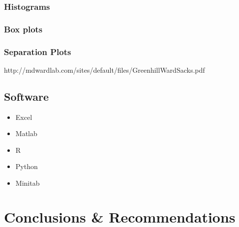 \documentclass[11pt,a4paper,article]{memoir} %
\begin{document}
\subsection{Histograms}
\subsection{Box plots}
\subsection{Separation Plots}
http://mdwardlab.com/sites/default/files/GreenhillWardSacks.pdf

\section{Software}
\begin{itemize}
\item Excel
\item Matlab
\item R
\item Python
\item Minitab
\end{itemize}

\newpage


\chapter{Conclusions \& Recommendations}

\newpage
\appendix
\chapter{}

\end{document}
